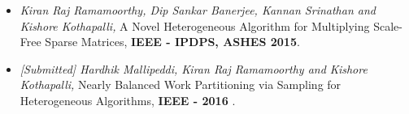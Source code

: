 \begin{itemize}

\item \textit{Kiran Raj Ramamoorthy, Dip Sankar Banerjee, Kannan Srinathan and Kishore Kothapalli,} A Novel Heterogeneous Algorithm for Multiplying Scale-Free Sparse Matrices, \textbf{IEEE - IPDPS, ASHES 2015}.

\item \textit{[Submitted] Hardhik Mallipeddi, Kiran Raj Ramamoorthy and Kishore Kothapalli,} Nearly Balanced Work Partitioning via Sampling for Heterogeneous Algorithms, \textbf{IEEE - 2016} .

\end{itemize}